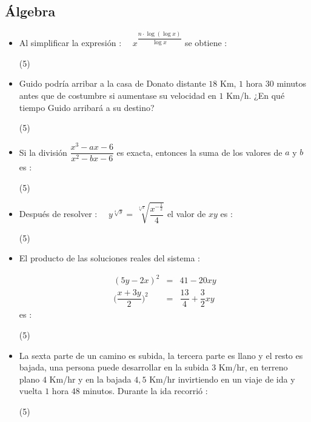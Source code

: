 \documentclass[10pt, twocolumn, landscape, a4paper]{article}
\begin{document}
\subsection*{Álgebra}

\begin{itemize}
\item{Al simplificar la expresión : $\quad x^{\dfrac{n \cdot \log(\log x)}{\log x}}$ se obtiene :
\begin{tasks}(5)
\end{tasks}
}
\item{Guido podría arribar a la casa de Donato distante $18$ Km, $1$ hora $30$ minutos antes que de costumbre si aumentase su velocidad en $1$ Km/h. ¿En qué tiempo Guido arribará a su destino?
\begin{tasks}(5)
\end{tasks}
}
\item{Si la división $\dfrac{x^3 - ax - 6}{x^2 - bx - 6}$ es exacta, entonces la suma de los valores de $a$ y $b$ es : 

\begin{tasks}(5)
\end{tasks}
}
\item{Después de resolver : $\quad y^{\sqrt[4]{y}} = \sqrt[{\sqrt[4]{x}}]{\dfrac{x^{- \frac1{2}}}{4}}$ el valor de $xy$ es :
\begin{tasks}(5)
\end{tasks}
}
\item{El producto de las soluciones reales del sistema : 

\begin{eqnarray*}
	(5y - 2x)^2 &=& 41 - 20xy \\
	\Big(\dfrac{x + 3y}{2}\Big)^2 &=& \dfrac{13}{4} + \dfrac{3}{2}xy
\end{eqnarray*}
es : 
\begin{tasks}(5)
\end{tasks}
}
\item{La sexta parte de un camino es subida, la tercera parte es llano y el resto es bajada, una persona puede desarrollar en la subida $3$ Km/hr, en terreno plano $4$ Km/hr y en la bajada $4,5$ Km/hr invirtiendo en un viaje de ida y vuelta $1$ hora $48$ minutos. Durante la ida recorrió :
\begin{tasks}(5)
\end{tasks}
}
\end{itemize}
\end{document}
